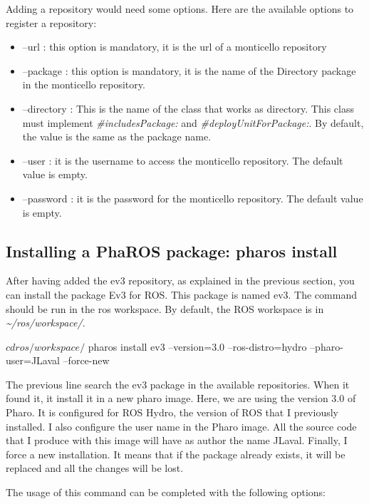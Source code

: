 \documentclass[a4paper,10pt,twoside]{book}
\begin{document}
Adding a repository would need some options. Here are the available options to register a repository:

\begin{itemize}
	\item --url	: this option is mandatory, it is the url of a monticello repository
         \item --package	: this option is mandatory, it is the name of the Directory package in the monticello repository.
         \item --directory	: This is the name of the class that works as directory. This class must implement  \emph{\#includesPackage:} and \emph{\#deployUnitForPackage:}. By default, the value is the same as the package name.
          \item --user : it is the username to access the monticello repository. The default value is empty.
          \item --password : it is the password for the monticello repository. The default value is empty.
\end{itemize}

\subsection{Installing a PhaROS package: pharos install}

After having added the ev3 repository, as explained in the previous section, you can install the package Ev3 for ROS. This package is named ev3. The command should be run in the ros workspace. By default, the ROS workspace is in \emph{{\textasciitilde}/ros/workspace/}.

\begin{code}{}
$ cd ros/workspace/
$ pharos install ev3 --version=3.0 --ros-distro=hydro --pharo-user=JLaval --force-new
\end{code}

The previous line search the ev3 package in the available repositories. When it found it, it install it in a new pharo image. Here, we are using the version 3.0 of Pharo. It is configured for ROS Hydro, the version of ROS that I previously installed. I also configure the user name in the Pharo image. All the source code that I produce with this image will have as author the name JLaval. Finally, I force a new installation. It means that if the package already exists, it will be replaced and all the changes will be lost. 

The usage of this command can be completed with the following options:
\end{document}
